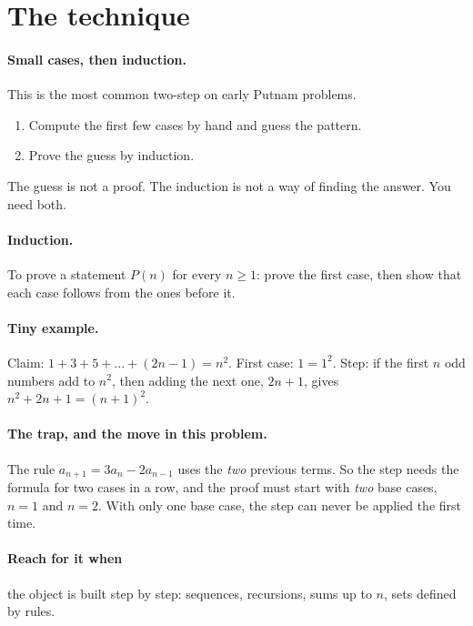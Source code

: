 \documentclass[11pt]{article}
\begin{document}

\section*{The technique}

\paragraph{Small cases, then induction.} This is the most common two-step on early Putnam problems.
\begin{enumerate}
  \item Compute the first few cases by hand and guess the pattern.
  \item Prove the guess by induction.
\end{enumerate}
The guess is not a proof. The induction is not a way of finding the answer. You need both.

\paragraph{Induction.} To prove a statement $P(n)$ for every $n \ge 1$: prove the first case, then show that each case follows from the ones before it.

\paragraph{Tiny example.} Claim: $1 + 3 + 5 + \dots + (2n - 1) = n^2$. First case: $1 = 1^2$. Step: if the first $n$ odd numbers add to $n^2$, then adding the next one, $2n + 1$, gives $n^2 + 2n + 1 = (n+1)^2$.

\paragraph{The trap, and the move in this problem.} The rule $a_{n+1} = 3a_n - 2a_{n-1}$ uses the \emph{two} previous terms. So the step needs the formula for two cases in a row, and the proof must start with \emph{two} base cases, $n = 1$ and $n = 2$. With only one base case, the step can never be applied the first time.

\paragraph{Reach for it when} the object is built step by step: sequences, recursions, sums up to $n$, sets defined by rules.
\end{document}
